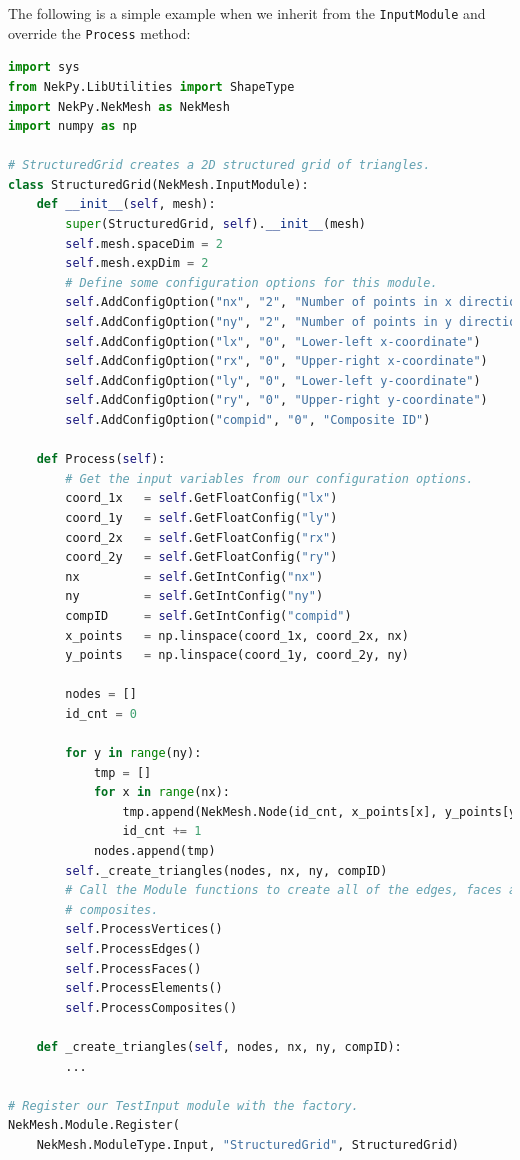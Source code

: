 The following is a simple example when we inherit from the \verb+InputModule+
and override the \verb+Process+ method:
\begin{lstlisting}[style=C++Style, language=Python]
import sys
from NekPy.LibUtilities import ShapeType
import NekPy.NekMesh as NekMesh
import numpy as np

# StructuredGrid creates a 2D structured grid of triangles.
class StructuredGrid(NekMesh.InputModule):
    def __init__(self, mesh):
        super(StructuredGrid, self).__init__(mesh)
        self.mesh.spaceDim = 2
        self.mesh.expDim = 2
        # Define some configuration options for this module.
        self.AddConfigOption("nx", "2", "Number of points in x direction")
        self.AddConfigOption("ny", "2", "Number of points in y direction")
        self.AddConfigOption("lx", "0", "Lower-left x-coordinate")
        self.AddConfigOption("rx", "0", "Upper-right x-coordinate")
        self.AddConfigOption("ly", "0", "Lower-left y-coordinate")
        self.AddConfigOption("ry", "0", "Upper-right y-coordinate")
        self.AddConfigOption("compid", "0", "Composite ID")

    def Process(self):
        # Get the input variables from our configuration options.
        coord_1x   = self.GetFloatConfig("lx")
        coord_1y   = self.GetFloatConfig("ly")
        coord_2x   = self.GetFloatConfig("rx")
        coord_2y   = self.GetFloatConfig("ry")
        nx         = self.GetIntConfig("nx")
        ny         = self.GetIntConfig("ny")
        compID     = self.GetIntConfig("compid")
        x_points   = np.linspace(coord_1x, coord_2x, nx)
        y_points   = np.linspace(coord_1y, coord_2y, ny)

        nodes = []
        id_cnt = 0

        for y in range(ny):
            tmp = []
            for x in range(nx):
                tmp.append(NekMesh.Node(id_cnt, x_points[x], y_points[y], 0.0))
                id_cnt += 1
            nodes.append(tmp)
        self._create_triangles(nodes, nx, ny, compID)
        # Call the Module functions to create all of the edges, faces and
        # composites.
        self.ProcessVertices()
        self.ProcessEdges()
        self.ProcessFaces()
        self.ProcessElements()
        self.ProcessComposites()

    def _create_triangles(self, nodes, nx, ny, compID):
        ...

# Register our TestInput module with the factory.
NekMesh.Module.Register(
    NekMesh.ModuleType.Input, "StructuredGrid", StructuredGrid)


\end{lstlisting}
